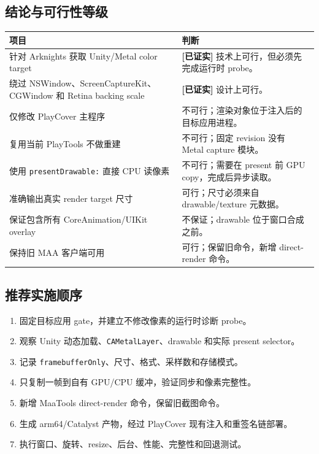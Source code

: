 \documentclass[UTF8,a4paper,11pt]{ctexart}
\newcommand{\verified}{\textbf{\color{verified}[已证实]}}
\begin{document}
\subsection{结论与可行性等级}

\begin{center}
\small
\begin{tabularx}{\textwidth}{>{\raggedright\arraybackslash}p{} X}
\toprule
项目 & 判断 \\
\midrule
针对 Arknights 获取 Unity/Metal color target & \verified{} 技术上可行，但必须先完成运行时 probe。\\
绕过 NSWindow、ScreenCaptureKit、CGWindow 和 Retina backing scale & \verified{} 设计上可行。\\
仅修改 PlayCover 主程序 & 不可行；渲染对象位于注入后的目标应用进程。\\
复用当前 PlayTools 不做重建 & 不可行；固定 revision 没有 Metal capture 模块。\\
使用 \texttt{presentDrawable:} 直接 CPU 读像素 & 不可行；需要在 present 前 GPU copy，完成后异步读取。\\
准确输出真实 render target 尺寸 & 可行；尺寸必须来自 drawable/texture 元数据。\\
保证包含所有 CoreAnimation/UIKit overlay & 不保证；drawable 位于窗口合成之前。\\
保持旧 MAA 客户端可用 & 可行；保留旧命令，新增 direct-render 命令。\\
\bottomrule
\end{tabularx}
\end{center}

\subsection{推荐实施顺序}

\begin{enumerate}
  \item 固定目标应用 gate，并建立不修改像素的运行时诊断 probe。
  \item 观察 Unity 动态加载、\texttt{CAMetalLayer}、drawable 和实际 present selector。
  \item 记录 \texttt{framebufferOnly}、尺寸、格式、采样数和存储模式。
  \item 只复制一帧到自有 GPU/CPU 缓冲，验证同步和像素完整性。
  \item 新增 MaaTools direct-render 命令，保留旧截图命令。
  \item 生成 arm64/Catalyst 产物，经过 PlayCover 现有注入和重签名链部署。
  \item 执行窗口、旋转、resize、后台、性能、完整性和回退测试。
\end{enumerate}
\end{document}
